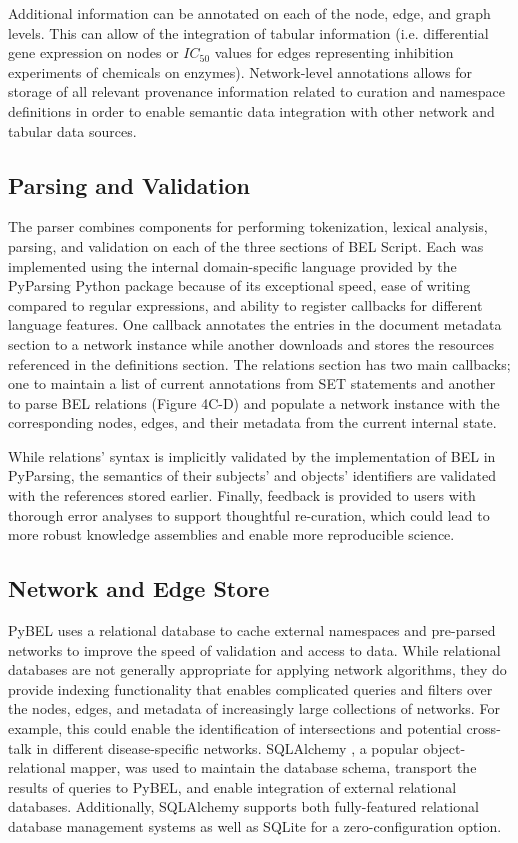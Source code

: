Additional information can be annotated on each of the node, edge, and graph levels. This can allow of the integration of tabular information (i.e. differential gene expression on nodes or $IC_{50}$ values for edges representing inhibition experiments of chemicals on enzymes). Network-level annotations allows for storage of all relevant provenance information related to curation and namespace definitions in order to enable semantic data integration with other network and tabular data sources. 

\subsection{Parsing and Validation}

The parser combines components for performing tokenization, lexical analysis, parsing, and validation on each of the three sections of BEL Script. Each was implemented using the internal domain-specific language provided by the PyParsing \cite{pyparsing} Python package because of its exceptional speed, ease of writing compared to regular expressions, and ability to register callbacks for different language features. One callback annotates the entries in the document metadata section to a network instance while another downloads and stores the resources referenced in the definitions section. The relations section has two main callbacks; one to maintain a list of current annotations from SET statements and another to parse BEL relations (Figure 4C-D) and populate a network instance with the corresponding nodes, edges, and their metadata from the current internal state.  

While relations' syntax is implicitly validated by the implementation of BEL in PyParsing, the semantics of their subjects' and objects' identifiers are validated with the references stored earlier. Finally, feedback is provided to users with thorough error analyses to support thoughtful re-curation, which could lead to more robust knowledge assemblies and enable more reproducible science.

\subsection{Network and Edge Store}

PyBEL uses a relational database to cache external namespaces and pre-parsed networks to improve the speed of validation and access to data. While relational databases are not generally appropriate for applying network algorithms, they do provide indexing functionality that enables complicated queries and filters over the nodes, edges, and metadata of increasingly large collections of networks. For example, this could enable the identification of intersections and potential cross-talk in different disease-specific networks. SQLAlchemy \cite{sqlalchemy}, a popular object-relational mapper, was used to maintain the database schema, transport the results of queries to PyBEL, and enable integration of external relational databases. Additionally, SQLAlchemy supports both fully-featured relational database management systems as well as SQLite \cite{sqlite} for a zero-configuration option. 

